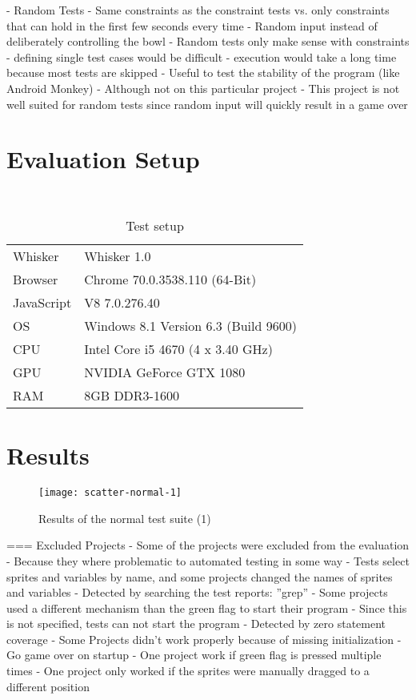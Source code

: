 - Random Tests
- Same constraints as the constraint tests vs. only constraints that can hold in the first few seconds every time
    - Random input instead of deliberately controlling the bowl
    - Random tests only make sense with constraints
        - defining single test cases would be difficult
        - execution would take a long time because most tests are skipped
    - Useful to test the stability of the program (like Android Monkey)
        - Although not on this particular project
    - This project is not well suited for random tests since random input will quickly result in a game over

\section{Evaluation Setup}

\begin{table}
    \centering
    \scriptsize \tt
    \begin{tabular}{ll}
        \toprule
        Whisker    & Whisker     1.0 \\
        Browser    & Chrome      70.0.3538.110 (64-Bit) \\
        JavaScript & V8          7.0.276.40 \\
        OS         & Windows 8.1 Version 6.3 (Build 9600) \\
        CPU        & Intel Core i5 4670 (4 x  3.40 GHz) \\
        GPU        & NVIDIA GeForce GTX 1080 \\
        RAM        & 8GB DDR3-1600 \\
        \bottomrule
    \end{tabular}
    \caption{Test setup}
    \label{tab:test_setup}
\end{table}

\section{Results}


\begin{figure}
    \centering
    \texttt{[image: scatter-normal-1]}
    \caption{Results of the normal test suite (1)}
    \label{fig:scatter_normal_1}
\end{figure}

=== Excluded Projects
- Some of the projects were excluded from the evaluation
- Because they where problematic to automated testing in some way
    - Tests select sprites and variables by name, and some projects changed the names of sprites and variables
        - Detected by searching the test reports: ''grep''
    - Some projects used a different mechanism than the green flag to start their program
        - Since this is not specified, tests can not start the program
        - Detected by zero statement coverage
    - Some Projects didn't work properly because of missing initialization
        - Go game over on startup
        - One project work if green flag is pressed multiple times
        - One project only worked if the sprites were manually dragged to a different position

